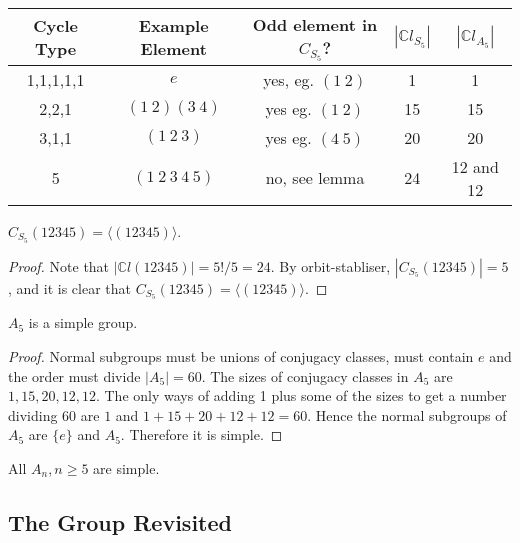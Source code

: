 \documentclass[a4paper]{article}
\begin{document}
\begin{example}
  \begin{center}
    \begin{tabular}{c|c|c|c|c}
      Cycle Type & Example Element & Odd element in $C_{S_5}$? &
      $|\mathbb{C}l_{S_5}|$ & $|\mathbb{C}l_{A_5}|$ \\
      \hline
      1,1,1,1,1 & $e$ & yes, eg. $(1\ 2)$ & 1 & 1\\
      2,2,1 & $(1\ 2)(3\ 4)$ & yes eg. $(1\ 2)$ & 15 & 15\\
      3,1,1 & $(1\ 2\ 3)$ & yes eg. $(4\ 5)$ & 20 & 20\\
      5 & $(1\ 2\ 3\ 4\ 5)$ & no, see lemma & 24 & 12 and 12\\
    \end{tabular}
  \end{center}
  \begin{lemma}\label{lma:5.31}
    $ C_{S_5}(12345)=\langle (12345) \rangle $.
  \end{lemma}
  \begin{proof}
    Note that $ |\mathbb{C}l(12345)|=5!/5=24 $. By orbit-stabliser, $
    |C_{S_5}(12345)|=5 $, and it is clear that
    $C_{S_5}(12345)=\langle (12345) \rangle$.
  \end{proof}
\end{example}
\begin{theorem}\label{thm:5.32}
  $A_5$ is a simple group.
\end{theorem}
\begin{proof}
  Normal subgroups must be unions of conjugacy classes, must contain
  $e$ and the order must divide $|A_5|=60$. The sizes of conjugacy
  classes in $A_5$ are $1,15,20,12,12$. The only ways of adding 1
  plus some of the sizes to get a number dividing 60 are $ 1 $ and $
  1+15+20+12+12=60 $. Hence the normal subgroups of $A_5$ are $\{e\}$
  and $A_5$. Therefore it is simple.
\end{proof}
\begin{remark}
  All $A_n, n\ge 5$ are simple.
\end{remark}

\subsection{The \mobius Group Revisited}
\end{document}
